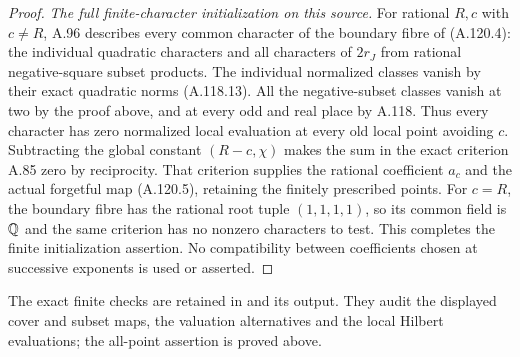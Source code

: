 \begin{proof}
\emph{The full finite-character initialization on this source.}
For rational $R,c$ with $c\ne R$, A.96 describes every
common character of the boundary fibre of (A.120.4):
the individual quadratic characters and all characters
of $2r_J$ from rational negative-square subset products.
The individual normalized classes vanish by their exact
quadratic norms (A.118.13).
All the negative-subset classes vanish at two by the
proof above, and at every odd and real place by A.118.
Thus every character has zero normalized local
evaluation at every old local point avoiding $c$.
Subtracting the global constant $(R-c,\chi)$ makes the
sum in the exact criterion A.85 zero by reciprocity.
That criterion supplies the rational coefficient $a_c$
and the actual forgetful map (A.120.5), retaining the
finitely prescribed points.
For $c=R$, the boundary fibre has the rational root
tuple $(1,1,1,1)$, so its common field is $\mathbb Q$ and the
same criterion has no nonzero characters to test.
This completes the finite initialization assertion.
No compatibility between coefficients chosen at
successive exponents is used or asserted.
\end{proof}

The exact finite checks are retained in
 and its
output.  They audit the displayed cover and subset maps,
the valuation alternatives and the local Hilbert
evaluations; the all-point assertion is proved above.
